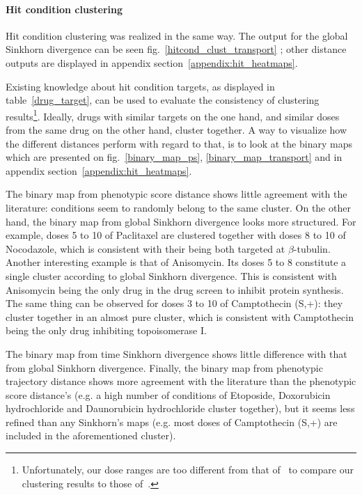 \paragraph{Hit condition clustering}
Hit condition clustering was realized in the same way. The output for the global Sinkhorn divergence can be seen fig.~\ref{hitcond_clust_transport} ; other distance outputs are displayed in appendix section~\ref{appendix:hit_heatmaps}.

Existing knowledge about hit condition targets, as displayed in table~\ref{drug_target}, can be used to evaluate the consistency of clustering results\footnote{Unfortunately, our dose ranges are too different from that of~\cite{pmid15539606} to compare our clustering results to those of~\cite{pmid17401369}.}. Ideally, drugs with similar targets on the one hand, and similar doses from the same drug on the other hand, cluster together. A way to visualize how the different distances perform with regard to that, is to look at the binary maps which are presented on fig.~\ref{binary_map_ps}, \ref{binary_map_transport} and in appendix section~\ref{appendix:hit_heatmaps}.

The binary map from phenotypic score distance shows little agreement with the literature: conditions seem to randomly belong to the same cluster. On the other hand, the binary map from global Sinkhorn divergence looks more structured. For example, doses 5 to 10 of Paclitaxel are clustered together with doses 8 to 10 of Nocodazole, which is consistent with their being both targeted at $\beta$-tubulin. Another interesting example is that of Anisomycin. Its doses 5 to 8 constitute a single cluster according to global Sinkhorn divergence. This is consistent with Anisomycin being the only drug in the drug screen to inhibit protein synthesis. The same thing can be observed for doses 3 to 10 of Camptothecin (S,+): they cluster together in an almost pure cluster, which is consistent with Camptothecin being the only drug inhibiting topoisomerase I.

The binary map from time Sinkhorn divergence shows little difference with that from global Sinkhorn divergence. Finally, the binary map from phenotypic trajectory distance shows more agreement with the literature than the phenotypic score distance's (e.g. a high number of conditions of Etoposide, Doxorubicin hydrochloride and Daunorubicin hydrochloride cluster together), but it seems less refined than any Sinkhorn's maps (e.g. most doses of Camptothecin (S,+) are included in the aforementioned cluster). %

